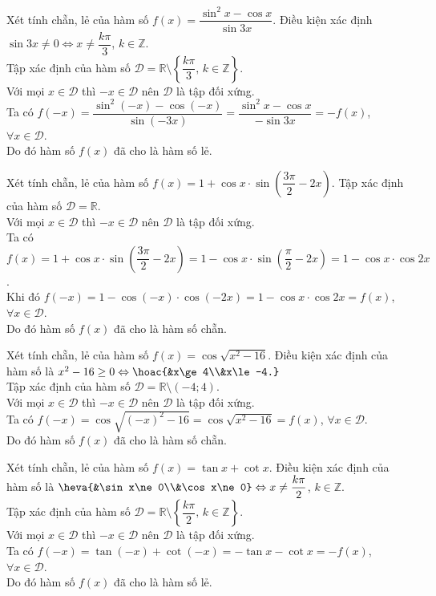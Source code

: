 \begin{bt}%
	Xét tính chẵn, lẻ của hàm số $f(x)=\dfrac{\sin^2 x-\cos x}{\sin 3x}$.
	\loigiai
	{
		Điều kiện xác định $\sin 3x\ne0\Leftrightarrow x\ne\dfrac{k\pi}{3}$, $k\in\mathbb{Z}$.\\
		Tập xác định của hàm số $\mathscr{D}=\mathbb{R}\setminus\left\{\dfrac{k\pi}{3},\,k\in\mathbb{Z}\right\}$.\\
		Với mọi $x\in\mathscr{D}$ thì $-x\in\mathscr{D}$ nên $\mathscr{D}$ là tập đối xứng.\\
		Ta có $f(-x)=\dfrac{\sin^2(-x)-\cos(-x)}{\sin(-3x)}=\dfrac{\sin^2 x-\cos x}{-\sin 3x}=-f(x)$, $\forall x\in\mathscr{D}$.\\
		Do đó hàm số $f(x)$ đã cho là hàm số lẻ.
	}
\end{bt}
\begin{bt}%
	Xét tính chẵn, lẻ của hàm số $f(x)=1+\cos x\cdot\sin\left(\dfrac{3\pi}{2}-2x\right)$.
	\loigiai
	{
		Tập xác định của hàm số $\mathscr{D}=\mathbb{R}$.\\
		Với mọi $x\in\mathscr{D}$ thì $-x\in\mathscr{D}$ nên $\mathscr{D}$ là tập đối xứng.\\
		Ta có $f(x)=1+\cos x\cdot\sin\left(\dfrac{3\pi}{2}-2x\right)=1-\cos x\cdot\sin\left(\dfrac{\pi}{2}-2x\right)=1-\cos x\cdot\cos 2x$.\\
		Khi đó $f(-x)=1-\cos(-x)\cdot\cos(-2x)=1-\cos x\cdot\cos 2x=f(x)$, $\forall x\in\mathscr{D}$.\\
		Do đó hàm số $f(x)$ đã cho là hàm số chẵn.
	}
\end{bt}
\begin{bt}%
	Xét tính chẵn, lẻ của hàm số $f(x)=\cos\sqrt{x^2-16}$.
	\loigiai
	{
		Điều kiện xác định của hàm số là $x^2-16\ge0\Leftrightarrow\hoac{&x\ge4\\&x\le-4.}$\\
		Tập xác định của hàm số $\mathscr{D}=\mathbb{R}\setminus(-4;4)$.\\
		Với mọi $x\in\mathscr{D}$ thì $-x\in\mathscr{D}$ nên $\mathscr{D}$ là tập đối xứng.\\
		Ta có $f(-x)=\cos\sqrt{(-x)^2-16}=\cos\sqrt{x^2-16}=f(x)$, $\forall x\in\mathscr{D}$.\\
		Do đó hàm số $f(x)$ đã cho là hàm số chẵn.
	}
\end{bt}
\begin{bt}%
	Xét tính chẵn, lẻ của hàm số $f(x)=\tan x+\cot x$.
	\loigiai
	{
		Điều kiện xác định của hàm số là $\heva{&\sin x\ne0\\&\cos x\ne0}\Leftrightarrow x\ne\dfrac{k\pi}{2}$, $k\in\mathbb{Z}$.\\
		Tập xác định của hàm số $\mathscr{D}=\mathbb{R}\setminus\left\{\dfrac{k\pi}{2},\,k\in\mathbb{Z}\right\}$.\\
		Với mọi $x\in\mathscr{D}$ thì $-x\in\mathscr{D}$ nên $\mathscr{D}$ là tập đối xứng.\\
		Ta có $f(-x)=\tan(-x)+\cot(-x)=-\tan x-\cot x=-f(x)$, $\forall x\in\mathscr{D}$.\\
		Do đó hàm số $f(x)$ đã cho là hàm số lẻ.
	}
\end{bt}
